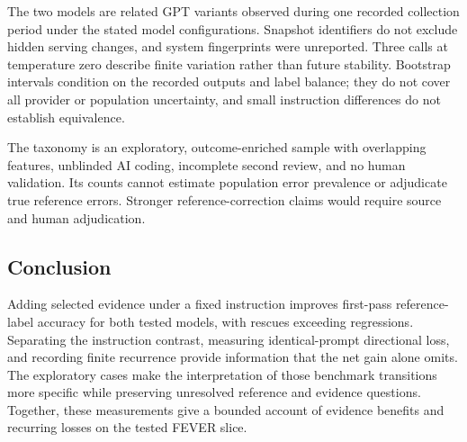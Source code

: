 \documentclass[11pt,letterpaper]{article}
\begin{document}
The two models are related GPT variants observed during one recorded collection period under the stated model configurations. Snapshot identifiers do not exclude hidden serving changes, and system fingerprints were unreported. Three calls at temperature zero describe finite variation rather than future stability. Bootstrap intervals condition on the recorded outputs and label balance; they do not cover all provider or population uncertainty, and small instruction differences do not establish equivalence.

The taxonomy is an exploratory, outcome-enriched sample with overlapping features, unblinded AI coding, incomplete second review, and no human validation. Its counts cannot estimate population error prevalence or adjudicate true reference errors. Stronger reference-correction claims would require source and human adjudication.

\subsection{Conclusion}
Adding selected evidence under a fixed instruction improves first-pass reference-label accuracy for both tested models, with rescues exceeding regressions. Separating the instruction contrast, measuring identical-prompt directional loss, and recording finite recurrence provide information that the net gain alone omits. The exploratory cases make the interpretation of those benchmark transitions more specific while preserving unresolved reference and evidence questions. Together, these measurements give a bounded account of evidence benefits and recurring losses on the tested FEVER slice.


\clearpage
\appendix
\end{document}
